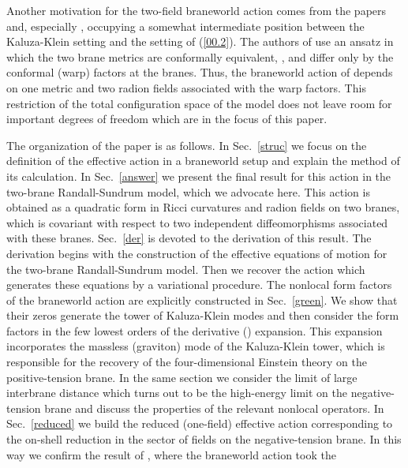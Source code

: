 \documentclass[a4paper,preprint,nofootinbib,
                 showpacs,preprintnumbers,amsmath,amssymb]{revtex4}
\begin{document}
Another motivation for the two-field braneworld action comes from 
the papers \cite{GarSas} and, especially \cite{GarPujTan}, 
occupying a somewhat intermediate position between the 
Kaluza-Klein setting and the setting of (\ref{00.2}). The authors 
of \cite{GarSas,GarPujTan} use an ansatz in which the two brane 
metrics \coordHE{} are conformally equivalent, 
\coordHE{}, and differ only by the 
conformal (warp) factors at the branes. Thus, the braneworld 
action of \cite{GarPujTan} depends on one metric and two radion 
fields associated with the warp factors. This restriction of the 
total configuration space of the model does not leave room for 
important degrees of freedom which are in the focus of this paper. 
 
The organization of the paper is as follows. In Sec.~\ref{struc} 
we focus on the definition of the effective 
action in a braneworld setup and explain the 
method of its calculation. In Sec.~\ref{answer} we 
present the final result for this action in the two-brane 
Randall-Sundrum model, which we advocate here. This action is 
obtained as a quadratic form in Ricci curvatures and radion fields 
on two branes, which is covariant with respect to two independent 
diffeomorphisms associated with these branes. Sec.~\ref{der} is 
devoted to the derivation of this result. The 
derivation begins with the construction of the 
effective equations of motion for the two-brane Randall-Sundrum 
model. Then we recover the action which 
generates these equations by a variational procedure. 
The nonlocal form factors of the braneworld action are explicitly 
constructed in Sec.~\ref{green}. We show that their zeros generate  
the tower of Kaluza-Klein modes and then consider the form factors  
in the few lowest orders of the derivative (\myHighlight{$\Box$}\coordHE{}) expansion. This  
expansion incorporates the massless (graviton) mode of the  
Kaluza-Klein tower, which is responsible for the recovery of  
the four-dimensional Einstein theory on the positive-tension brane.  
In the same section we consider the limit of large interbrane  
distance which turns out to be the high-energy limit on the  
negative-tension brane and discuss the properties of the relevant 
nonlocal operators. In Sec.~\ref{reduced} we build the reduced  
(one-field) effective action corresponding to the on-shell  
reduction in the sector of fields on the negative-tension brane.  
In this way we confirm the result of \cite{brane}, where the  
braneworld action took the 
\end{document}

